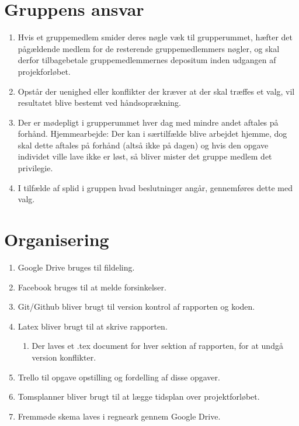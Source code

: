 \section{Gruppens ansvar}
\begin{enumerate}
\item Hvis et gruppemedlem smider deres nøgle væk til grupperummet, hæfter det pågældende medlem for de resterende gruppemedlemmers nøgler, og skal derfor tilbagebetale gruppemedlemmernes depositum inden udgangen af projekforløbet.
\item Opstår der uenighed eller konflikter der kræver at der skal træffes et valg, vil resultatet blive bestemt ved håndsoprækning.
\item Der er mødepligt i grupperummet hver dag med mindre andet aftales på forhånd.
Hjemmearbejde: Der kan i særtilfælde blive arbejdet hjemme, dog skal dette aftales på forhånd (altså ikke på dagen) og hvis den opgave individet ville lave ikke er løst, så bliver mister det gruppe medlem det privilegie.
\item I tilfælde af splid i gruppen hvad beslutninger angår, gennemføres dette med valg.
\end{enumerate}

\section{Organisering}
\begin{enumerate}
\item Google Drive bruges til fildeling.
\item Facebook bruges til at melde forsinkelser.
\item Git/Github bliver brugt til version kontrol af rapporten og koden.
\item Latex bliver brugt til at skrive rapporten.
\begin{enumerate}
\item Der laves et .tex document for hver sektion af rapporten, for at undgå version konflikter.
\end{enumerate}
\item Trello til opgave opstilling og fordelling af disse opgaver.
\item Tomsplanner bliver brugt til at lægge tidsplan over projektforløbet.
\item Fremmøde skema laves i regneark gennem Google Drive.
\end{enumerate}

